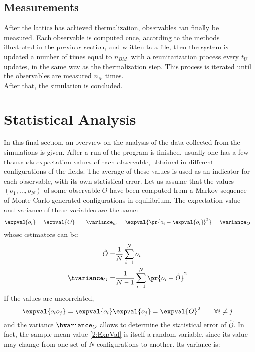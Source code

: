 \subsection{Measurements}
After the lattice has achieved thermalization, observables can finally be measured.
Each observable is computed once, according to the methods illustrated in the previous section, and written to a file, then the system is updated a number of times equal to $n_{BM}$, with a reunitarization process every $t_U$ updates, in the same way as the thermalization step.
This process is iterated until the observables are measured $n_M$ times.\\
After that, the simulation is concluded.

\section{Statistical Analysis}
In this final section, an overview on the analysis of the data collected from the simulations is given.
After a run of the program is finished, usually one has a few thousands expectation values of each observable, obtained in different configurations of the fields.
The average of these values is used as an indicator for each observable, with its own statistical error.
Let us assume that the values $(o_1,\dots,o_N)$ of some observable $O$ have been computed from a Markov sequence of Monte Carlo generated configurations in equilibrium.
The expectation value and variance of these variables are the same:
\begin{equation}
    \expval{o_i} = \expval{O} \qquad \variance_{o_i} = \expval{\pr{o_i-\expval{o_i}}^2} = \variance_O
\end{equation}
whose estimators can be:
\begin{align}
    \hat{O} =& \frac1N\sum_{i=1}^N o_i \label{2:ExpVal}\\
    \hvariance_O =& \frac1{N-1}\sum_{i=1}^N\pr{o_i-\hat{O}}^2 \label{2:Variance}
\end{align}
If the values are uncorrelated,
\begin{equation}
    \expval{o_io_j} = \expval{o_i}\expval{o_j} = \expval{O}^2 \qquad \forall i\neq j \label{2:UncorrVariance}
\end{equation}
and the variance $\hvariance_O$ allows to determine the statistical error of $\hat{O}$.
In fact, the sample mean value \eqref{2:ExpVal} is itself a random variable, since its value may change from one set of $N$ configurations to another.
Its variance is:

